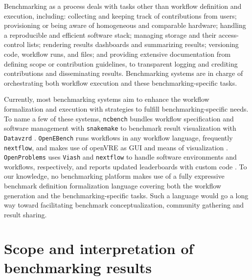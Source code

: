 \documentclass[11pt]{article}
\begin{document}
Benchmarking as a process deals with tasks other than workflow definition and execution, including: collecting and keeping track of contributions from users; provisioning or being aware of homogeneous and comparable hardware; handling a reproducible and efficient software stack; managing storage and their access-control lists; rendering results dashboards and summarizing results; versioning code, workflow runs, and files; and providing extensive documentation from defining scope or contribution guidelines, to transparent logging and crediting contributions and disseminating results. Benchmarking systems are in charge of orchestrating both workflow execution and these benchmarking-specific tasks.

Currently, most benchmarking systems aim to enhance the workflow formalization and execution with strategies to fulfill benchmarking-specific needs. To name a few of these systems, \texttt{ncbench} bundles workflow specification and software management with \texttt{snakemake} to benchmark result visualization with \texttt{Datavzrd} \cite{Hanssen2023-uf}. \texttt{OpenEBench} runs workflows in any workflow language, frequently \texttt{nextflow}, and makes use of openVRE as GUI and means of visualization \cite{Capella-Gutierrez2017-dh}. \texttt{OpenProblems} uses \texttt{Viash} and \texttt{nextflow} to handle software environments and workflows, respectively, and reports updated leaderboards with custom code \cite{Luecken2024-fk}. To our knowledge, no benchmarking platform makes use of a fully expressive benchmark definition formalization language covering both the workflow generation and the benchmarking-specific tasks. Such a language would go a long way toward facilitating benchmark conceptualization, community gathering and result sharing.

\section*{Scope and interpretation of benchmarking results}
\end{document}
